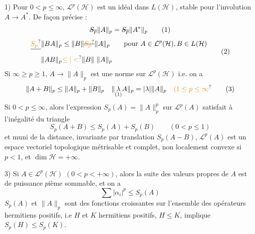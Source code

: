 1) Pour  $0<p\leq\infty$, $\mathcal L^p(\mathcal H)$ est un idéal 
dans $L(\mathcal H)$, stable pour l'involution $A\to A^*$. De
 façon précise :
\[
\deleted{S_p}\|A\|_p=\deleted{S_p}\|A^*\|_p \tag*{(1)}
\]
\[
\begin{aligned}
\deleted{\unsure{S_p}}\|BA\|_p&\leq\|B\|\deleted{\unsure{S_p}}\|A\|_p
\qquad\text{pour } A\in\mathcal L^p(\mathcal H),B\in L(\mathcal H)\\
\|AB\|_p&\unsure{\leq|<}\|B\|\ \|A\|_p
\end{aligned}\tag*{(2)}
\]
Si $\infty\geq p\geq1$, $A\to\|A\|_p$ est une norme sur $\mathcal L^p(\mathcal H)$ 
i.e. on a
\[
\|A+B\|_p\leq\|A\|_p+\|B\|_p\quad\|\underset{\text{(1)}}{\lambda} A\|_p=|\lambda|\|A\|_p
\quad\unsure{(1\leq p\leq\infty}\tag*{(3)}
\]
Si $0<p\leq\infty$, alors l'expression $S_p(A)=\|A\|_p^p$ sur
$\mathcal L^p(A)$ satisfait à l'inégalité du triangle
\[
S_p(A+B)\leq S_p(A)+S_p(B)\qquad(0<p\leq1)\tag*{(4)}
\]
et muni de la distance, invariante par translation
$S_p(A-B)$, $\mathcal L^p(A)$ est un espace vectoriel topologique
métrisable et complet, non localement convexe
si $p<1$, et $\dim\mathcal H=+\infty$.

3) Si $A\in\mathcal L^p(\mathcal H)$ $(0<p<+\infty)$, alors la suite
des valeurs propres  de $A$ est de puissance
$p$ième sommable, et on a
\[
\sum|\alpha_i|^p\leq S_p(A)\tag*{(5)}
\]
$S_p(A)$ et $\|A\|_p$ sont des fonctions croissantes
sur l'ensemble des opérateurs hermitiens
positifs, i.e $H$ et $K$ hermitiens positifs, $H\leq K$,
implique $S_p(H)\leq S_p(K)$.

